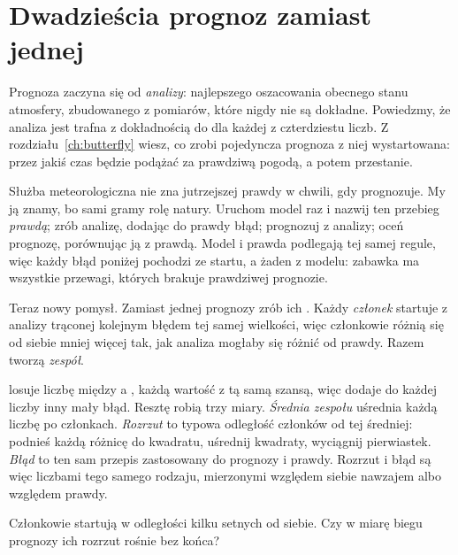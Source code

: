 \section{Dwadzieścia prognoz zamiast jednej}
\label{sec:ch14-ensemble}

\noindent
Prognoza zaczyna się od \emph{analizy}: najlepszego oszacowania obecnego
stanu atmosfery, zbudowanego z pomiarów, które nigdy nie są dokładne.
Powiedzmy, że analiza jest trafna z dokładnością do  dla
każdej z czterdziestu liczb. Z rozdziału~\ref{ch:butterfly} wiesz, co zrobi
pojedyncza prognoza z niej wystartowana: przez jakiś czas będzie podążać za
prawdziwą pogodą, a potem przestanie.

Służba meteorologiczna nie zna jutrzejszej prawdy w chwili, gdy prognozuje.
My ją znamy, bo sami gramy rolę natury. Uruchom model raz i nazwij ten
przebieg \emph{prawdą}; zrób analizę, dodając do prawdy błąd; prognozuj z
analizy; oceń prognozę, porównując ją z prawdą. Model i prawda podlegają tej
samej regule, więc każdy błąd poniżej pochodzi ze startu, a żaden z modelu:
zabawka ma wszystkie przewagi, których brakuje prawdziwej prognozie.

Teraz nowy pomysł. Zamiast jednej prognozy zrób ich .
Każdy \emph{członek} startuje z analizy trąconej kolejnym błędem tej samej
wielkości, więc członkowie różnią się od siebie mniej więcej tak, jak analiza
mogłaby się różnić od prawdy. Razem tworzą \emph{zespół}.


\noindent
{} losuje liczbę między  a
, każdą wartość z tą samą szansą, więc  dodaje do
każdej liczby inny mały błąd. Resztę robią trzy miary. \emph{Średnia zespołu}
uśrednia każdą liczbę po członkach. \emph{Rozrzut} to typowa odległość
członków od tej średniej: podnieś każdą różnicę do kwadratu, uśrednij
kwadraty, wyciągnij pierwiastek. \emph{Błąd} to ten sam przepis zastosowany
do prognozy i prawdy. Rozrzut i błąd są więc liczbami tego samego rodzaju,
mierzonymi względem siebie nawzajem albo względem prawdy.

\begin{think}
Członkowie startują w odległości kilku setnych od siebie. Czy w miarę biegu
prognozy ich rozrzut rośnie bez końca?
\end{think}

